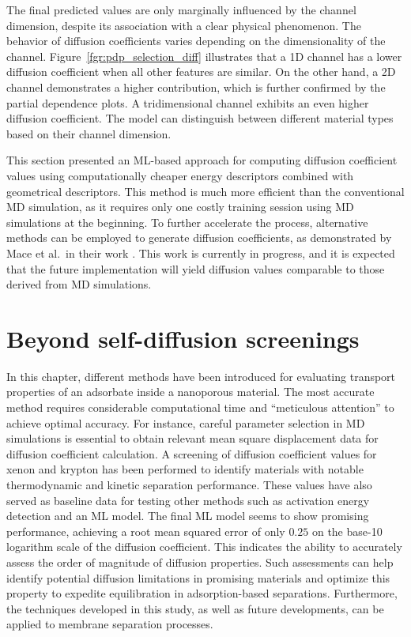 \documentclass[main]{subfiles}
\begin{document}
The final predicted values are only marginally influenced by the channel dimension, despite its association with a clear physical phenomenon. The behavior of diffusion coefficients varies depending on the dimensionality of the channel. Figure~\ref{fgr:pdp_selection_diff} illustrates that a 1D channel has a lower diffusion coefficient when all other features are similar. On the other hand, a 2D channel demonstrates a higher contribution, which is further confirmed by the partial dependence plots. A tridimensional channel exhibits an even higher diffusion coefficient. The model can distinguish between different material types based on their channel dimension.

This section presented an ML-based approach for computing diffusion coefficient values using computationally cheaper energy descriptors combined with geometrical descriptors. This method is much more efficient than the conventional MD simulation, as it requires only one costly training session using MD simulations at the beginning. To further accelerate the process, alternative methods can be employed to generate diffusion coefficients, as demonstrated by Mace et al.\ in their work \autocite{Mace_2019}. This work is currently in progress, and it is expected that the future implementation will yield diffusion values comparable to those derived from MD simulations.

\section{Beyond self-diffusion screenings}

In this chapter, different methods have been introduced for evaluating transport properties of an adsorbate inside a nanoporous material. The most accurate method requires considerable computational time and ``meticulous attention'' to achieve optimal accuracy. For instance, careful parameter selection in MD simulations is essential to obtain relevant mean square displacement data for diffusion coefficient calculation. A screening of diffusion coefficient values for xenon and krypton has been performed to identify materials with notable thermodynamic and kinetic separation performance. These values have also served as baseline data for testing other methods such as activation energy detection and an ML model. The final ML model seems to show promising performance, achieving a root mean squared error of only $0.25$ on the base-10 logarithm scale of the diffusion coefficient. This indicates the ability to accurately assess the order of magnitude of diffusion properties. Such assessments can help identify potential diffusion limitations in promising materials and optimize this property to expedite equilibration in adsorption-based separations. Furthermore, the techniques developed in this study, as well as future developments, can be applied to membrane separation processes.
\end{document}
